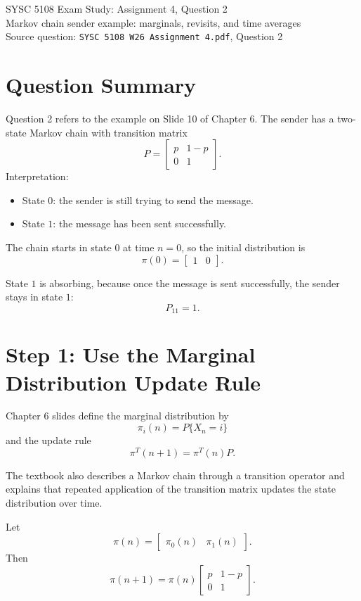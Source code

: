 \documentclass[11pt]{article}
\begin{document}
\begin{center}
{\Large SYSC 5108 Exam Study: Assignment 4, Question 2}\\
\vspace{0.3em}
{\large Markov chain sender example: marginals, revisits, and time averages}\\
\vspace{0.3em}
Source question: \texttt{SYSC 5108 W26 Assignment 4.pdf}, Question 2
\end{center}

\section*{Question Summary}

Question 2 refers to the example on Slide 10 of Chapter 6. The sender has a two-state Markov chain with transition matrix
\[
P=
\begin{bmatrix}
p & 1-p\\
0 & 1
\end{bmatrix}.
\]
Interpretation:
\begin{itemize}
\item State \(0\): the sender is still trying to send the message.
\item State \(1\): the message has been sent successfully.
\end{itemize}

The chain starts in state \(0\) at time \(n=0\), so the initial distribution is
\[
\pi(0)=
\begin{bmatrix}
1 & 0
\end{bmatrix}.
\]

State \(1\) is absorbing, because once the message is sent successfully, the sender stays in state \(1\):
\[
P_{11}=1.
\]

\section*{Step 1: Use the Marginal Distribution Update Rule}

Chapter 6 slides define the marginal distribution by
\[
\pi_i(n)=P\{X_n=i\}
\]
and the update rule
\[
\pi^T(n+1)=\pi^T(n)P.
\]

The textbook also describes a Markov chain through a transition operator and explains that repeated application of the transition matrix updates the state distribution over time.

Let
\[
\pi(n)=
\begin{bmatrix}
\pi_0(n) & \pi_1(n)
\end{bmatrix}.
\]
Then
\[
\pi(n+1)=\pi(n)
\begin{bmatrix}
p & 1-p\\
0 & 1
\end{bmatrix}.
\]
\end{document}
